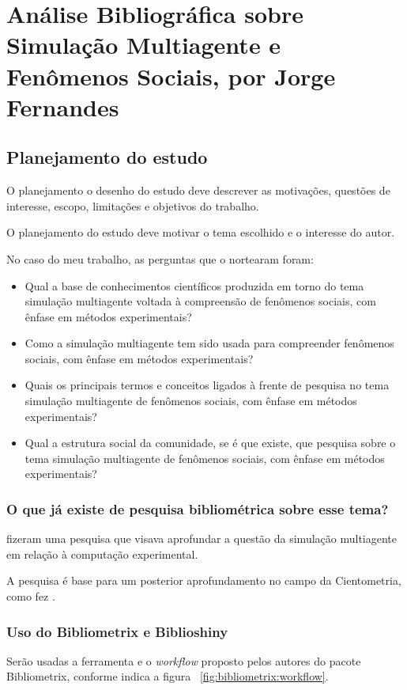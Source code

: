 \chapter{Análise Bibliográfica sobre Simulação Multiagente e Fenômenos Sociais, por Jorge Fernandes\label{chap:bibliometria:jhcf:2}}

\section{Planejamento do estudo\label{MASSA@jhcf:questoes}}
O planejamento o  desenho do estudo deve descrever as motivações, questões de interesse, escopo, limitações e objetivos do trabalho.

O planejamento do estudo deve motivar o tema escolhido e o interesse do autor.

No caso do meu trabalho, as perguntas que o nortearam foram:
\begin{itemize}
    \item Qual a base de conhecimentos científicos produzida em torno do tema simulação multiagente voltada à compreensão de fenômenos sociais, com ênfase em métodos experimentais? 
    \item Como a simulação multiagente tem sido usada para compreender fenômenos sociais, com ênfase em métodos experimentais? 
    \item Quais os principais termos e conceitos ligados à frente de pesquisa no tema simulação multiagente de fenômenos sociais, com ênfase em métodos experimentais? 
    \item Qual a estrutura social da comunidade, se é que existe, que pesquisa sobre o tema simulação multiagente de fenômenos sociais, com ênfase em métodos experimentais?
\end{itemize}

\subsection{O que já existe de pesquisa bibliométrica sobre esse tema?}

\cite{gore_classifying_2016} fizeram uma pesquisa que visava aprofundar a questão da simulação multiagente em relação à computação experimental.

A pesquisa é base para um posterior aprofundamento no campo da Cientometria, como fez \cite{chavalarias_whats_2017}.

\subsection{Uso do Bibliometrix e Biblioshiny}
Serão usadas a ferramenta e o \textit{workflow} proposto pelos autores do pacote Bibliometrix, conforme indica a figura ~\ref{fig:bibliometrix:workflow}.


